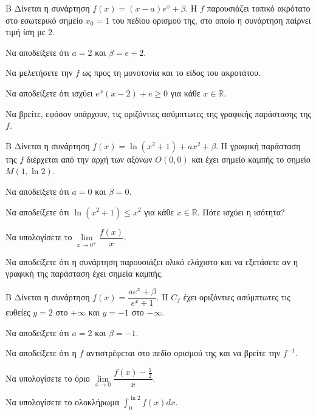 \begin{thema}{Β}
Δίνεται η συνάρτηση $f(x) = (x-a)e^x + \beta$. Η $f$ παρουσιάζει τοπικό ακρότατο στο εσωτερικό σημείο $x_0=1$ του πεδίου ορισμού της, στο οποίο η συνάρτηση παίρνει τιμή ίση με $2$.
\begin{erwthma}
  \item Να αποδείξετε ότι $a=2$ και $\beta = e+2$.
  \item Να μελετήσετε την $f$ ως προς τη μονοτονία και το είδος του ακροτάτου.
  \item Να αποδείξετε ότι ισχύει $e^x(x-2)+e \ge 0$ για κάθε $x \in \mathbb{R}$.
  \item Να βρείτε, εφόσον υπάρχουν, τις οριζόντιες ασύμπτωτες της γραφικής παράστασης της $f$.
\end{erwthma}
\end{thema}

\begin{thema}{Β}
Δίνεται η συνάρτηση $f(x) = \ln(x^2+1) + a x^2 + \beta$. Η γραφική παράσταση της $f$ διέρχεται από την αρχή των αξόνων $O(0,0)$ και έχει σημείο καμπής το σημείο $M(1, \ln 2)$.
\begin{erwthma}
  \item Να αποδείξετε ότι $a=0$ και $\beta=0$.
  \item Να αποδείξετε ότι $\ln(x^2+1) \le x^2$ για κάθε $x \in \mathbb{R}$. Πότε ισχύει η ισότητα?
  \item Να υπολογίσετε το $\lim\limits_{x \to 0^+} \dfrac{f(x)}{x}$.
  \item Να αποδείξετε ότι η συνάρτηση παρουσιάζει ολικό ελάχιστο και να εξετάσετε αν η γραφική της παράσταση έχει σημεία καμπής.
\end{erwthma}
\end{thema}

\begin{thema}{Β}
Δίνεται η συνάρτηση $f(x) = \dfrac{a e^x + \beta}{e^x + 1}$. Η $C_f$ έχει οριζόντιες ασύμπτωτες τις ευθείες $y=2$ στο $+\infty$ και $y=-1$ στο $-\infty$.
\begin{erwthma}
  \item Να αποδείξετε ότι $a=2$ και $\beta=-1$.
  \item Να αποδείξετε ότι η $f$ αντιστρέφεται στο πεδίο ορισμού της και να βρείτε την $f^{-1}$.
  \item Να υπολογίσετε το όριο $\lim\limits_{x \to 0} \dfrac{f(x)-\frac{1}{2}}{x}$.
  \item Να υπολογίσετε το ολοκλήρωμα $\displaystyle\int_0^{\ln 2} f(x)dx$.
\end{erwthma}
\end{thema}

